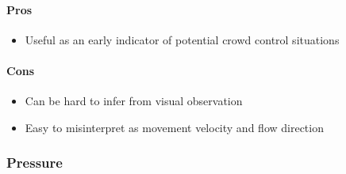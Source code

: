 
\paragraph{Pros}
\begin{itemize}
    \item Useful as an early indicator of potential crowd control situations
\end{itemize}

\paragraph{Cons}
\begin{itemize}
    \item Can be hard to infer from visual observation
    \item Easy to misinterpret as movement velocity and flow direction
\end{itemize}

\subsubsection{Pressure}


